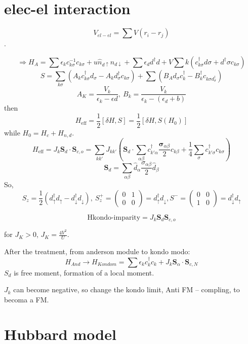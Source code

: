  \section{elec-el interaction}

 \[V_{el-el} = \sum V(r_i - r_j)\].

 \[
  \Rightarrow H_A = \sum \epsilon_k c_{k\sigma}^{-1} c_{k\sigma}
+ u \hat n_{d\uparrow}n_{d\downarrow} + \sum \epsilon_d d^\dagger d
+ V \sum k (c_{k\sigma}^\dagger d \sigma + d^\dagger \sigma c_{k\sigma})
\]
\[
 S = \sum_{k\sigma} (A_k c_{k\sigma}^\dagger d_\sigma - A_k d_\sigma^\dagger c_{k\sigma}) + \sum (B_A d_\sigma c_k^\dagger - B_k^\dagger c_{k\sigma d_\sigma^\dagger})
\]
\[
  A_K = \frac{V_k}{\epsilon_k - \epsilon d},~ B_k = \frac{V_k}{\epsilon_k - (\epsilon_d + b)}
\]
then
\[
 H_\text{eff} = \frac12 [\delta H, S] = \frac12 [\delta H, S(H_0)]
\]
while $H_0 = H_c + H_{n,d}$.
\[
  H_\text{eff} = J_k \bm S_d \cdot \bm S_{c,o}
= \sum_{kk'} J_{kk'} (\bm S_d \cdot \sum_{\alpha\beta} c_{k'\alpha}^\dagger \frac{\bm \sigma_{\alpha\beta}}2 c_{k\beta} + \frac14 \sum_\sigma c_{k'\sigma}^\dagger c_{k\sigma})
\]
\[
  \bm S_d = \sum_{\alpha\beta} \hat d_\alpha \frac{\sigma_{\alpha\beta}}{2} \hat d_\beta
\]
So,
\[
  S_z = \frac12 (d_\uparrow^\dagger d_\uparrow
              - d_\downarrow^\dagger d_\downarrow),~
  S_z^+ =
  \begin{pmatrix}
    0 & 1\\0 & 0
  \end{pmatrix} = d_\uparrow^\dagger d_\downarrow,
  S^- =
  \begin{pmatrix}
    0 & 0\\1 & 0
  \end{pmatrix} = d_\downarrow^\dagger d_\uparrow
\]
\begin{framed}
  \[\text{Hkondo-imparity} = J_k \bm S_d \bm S_{c,o}\]
\end{framed}
for $J_K > 0$, $J_K = \frac{4V^2}{U}$.

After the treatment, from anderson module to kondo modo:
\[
  H_{And} \to H_{Kondo m} = \sum \epsilon_k c_k^\dagger c_k + J_k \bm S_\alpha \cdot \bm S_{c,N}
\]
$S_d$ is free moment, formation of a local moment.

$J_k$ can become negative, so change the kondo limit, Anti FM -- compling,
to becoma a FM.

\section{Hubbard model}

